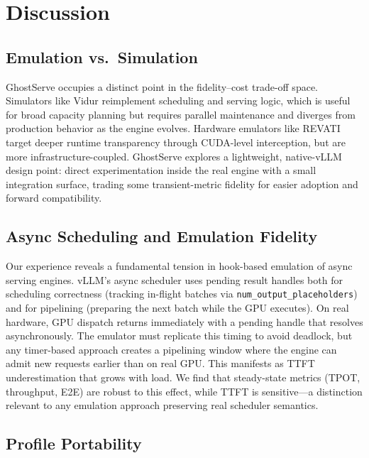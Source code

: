 \documentclass[conference]{IEEEtran}
\newcommand{\sysname}{GhostServe}
\begin{document}
\section{Discussion}

\subsection{Emulation vs.\ Simulation}

\sysname{} occupies a distinct point in the fidelity--cost trade-off space. Simulators like Vidur reimplement scheduling and serving logic, which is useful for broad capacity planning but requires parallel maintenance and diverges from production behavior as the engine evolves. Hardware emulators like REVATI target deeper runtime transparency through CUDA-level interception, but are more infrastructure-coupled. \sysname{} explores a lightweight, native-vLLM design point: direct experimentation inside the real engine with a small integration surface, trading some transient-metric fidelity for easier adoption and forward compatibility.

\subsection{Async Scheduling and Emulation Fidelity}

Our experience reveals a fundamental tension in hook-based emulation of async serving engines. vLLM's async scheduler uses pending result handles both for scheduling correctness (tracking in-flight batches via \texttt{num\_output\_placeholders}) and for pipelining (preparing the next batch while the GPU executes). On real hardware, GPU dispatch returns immediately with a pending handle that resolves asynchronously. The emulator must replicate this timing to avoid deadlock, but any timer-based approach creates a pipelining window where the engine can admit new requests earlier than on real GPU. This manifests as TTFT underestimation that grows with load. We find that steady-state metrics (TPOT, throughput, E2E) are robust to this effect, while TTFT is sensitive---a distinction relevant to any emulation approach preserving real scheduler semantics.

\subsection{Profile Portability}
\end{document}
